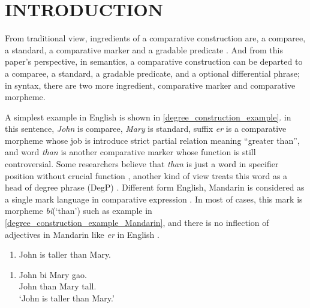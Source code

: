 \documentclass{ctexart}
\let \cite \parencite
\begin{document}
\thispagestyle{empty} %

\newpage

\tableofcontents

\thispagestyle{empty} %

\newpage

\section{INTRODUCTION}

\setcounter{page}{1}

\noindent
From traditional view, ingredients of a comparative construction are, a comparee, a standard, a comparative marker and a gradable predicate \cite{guo2012}. And from this paper's perspective, in semantics, a comparative construction can be departed to a comparee, a standard, a gradable predicate, and a optional differential phrase; in syntax, there are two more ingredient, comparative marker and comparative morpheme.

A simplest example in English is shown in \ref{degree_construction_example}. in this sentence, \textit{John} is comparee, \textit{Mary} is standard, suffix \textit{er} is a comparative morpheme whose job is introduce strict partial relation meaning ``greater than'', and word \textit{than} is another comparative marker whose function is still controversial. Some researchers believe that \textit{than} is just a word in specifier position without crucial function \cite{von1984a,heim1985,bhatt2004,rullmann1995}, another kind of view treats this word as a head of degree phrase (DegP) \cite{bierwisch1989,corver1990,corver1993,corver1997a,kennedy1997,grano2012}. Different form English, Mandarin is considered as a single mark language in comparative expression \cite{bobaljik2012,grano2012}. In most of cases, this mark is morpheme \textit{bi}(`than') such as example in \ref{degree_construction_example_Mandarin}, and there is no inflection of adjectives in Mandarin like \textit{er} in English \cite{guo2012}. 

\begin{enumerate}
    \item \label{degree_construction_example}
    John is taller than Mary.
\end{enumerate}

\begin{enumerate}
    \item \label{degree_construction_example_Mandarin}
    John \enspace bi \enspace Mary \enspace gao.  \\
    John than Mary \enspace tall. \\
    `John is taller than Mary.'
\end{enumerate}
\end{document}

